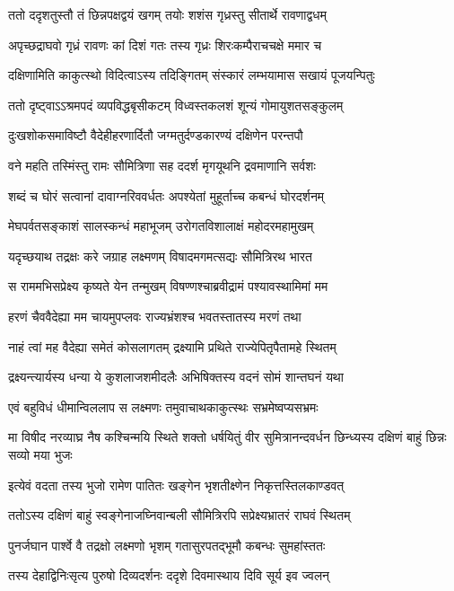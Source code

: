 \twolineshloka
{ततो ददृशतुस्तौ तं छिन्नपक्षद्वयं खगम्}
{तयोः शशंस गृध्रस्तु सीतार्थे रावणाद्वधम्}


\twolineshloka
{अपृच्छद्राघवो गृध्रं रावणः कां दिशं गतः}
{तस्य गृध्रः शिरःकम्पैराचचक्षे ममार च}


\twolineshloka
{दक्षिणामिति काकुत्स्थो विदित्वाऽस्य तदिङ्गितम्}
{संस्कारं लम्भयामास सखायं पूजयन्पितुः}


\twolineshloka
{ततो दृष्ट्वाऽऽश्रमपदं व्यपविद्धबृसीकटम्}
{विध्वस्तकलशं शून्यं गोमायुशतसङ्कुलम्}


\twolineshloka
{दुःखशोकसमाविष्टौ वैदेहीहरणार्दितौ}
{जग्मतुर्दण्डकारण्यं दक्षिणेन परन्तपौ}


\twolineshloka
{वने महति तस्मिंस्तु रामः सौमित्रिणा सह}
{ददर्श मृगयूथनि द्रवमाणानि सर्वशः}


\twolineshloka
{शब्दं च घोरं सत्वानां दावाग्नरिववर्धतः}
{अपश्येतां मुहूर्ताच्च कबन्धं घोरदर्शनम्}


\twolineshloka
{मेघपर्वतसङ्काशं सालस्कन्धं महाभूजम्}
{उरोगतविशालाक्षं महोदरमहामुखम्}


\twolineshloka
{यदृच्छयाथ तद्रक्षः करे जग्राह लक्ष्मणम्}
{विषादमगमत्सद्यः सौमित्रिरथ भारत}


\twolineshloka
{स राममभिसप्रेक्ष्य कृष्यते येन तन्मुखम्}
{विषण्णश्चाब्रवीद्रामं पश्यावस्थामिमां मम}


\twolineshloka
{हरणं चैववैदेह्या मम चायमुपप्लवः}
{राज्यभ्रंशश्च भवतस्तातस्य मरणं तथा}


\twolineshloka
{नाहं त्वां मह वैदेह्या समेतं कोसलागतम्}
{द्रक्ष्यामि प्रथिते राज्येपितृपैतामहे स्थितम्}


\twolineshloka
{द्रक्ष्यन्त्यार्यस्य धन्या ये कुशलाजशमीदलैः}
{अभिषिक्तस्य वदनं सोमं शान्तघनं यथा}


\twolineshloka
{एवं बहुविधं धीमान्विललाप स लक्ष्मणः}
{तमुवाचाथकाकुत्स्थः सभ्रमेष्वप्यसभ्रमः}


\threelineshloka
{मा विषीद नरव्याघ्र नैष कश्चिन्मयि स्थिते}
{शक्तो धर्षयितुं वीर सुमित्रानन्दवर्धन}
{छिन्ध्यस्य दक्षिणं बाहुं छिन्नः सव्यो मया भुजः}


\twolineshloka
{इत्येवं वदता तस्य भुजो रामेण पातितः}
{खङ्गेन भृशतीक्ष्णेन निकृत्तस्तिलकाण्डवत्}


\twolineshloka
{ततोऽस्य दक्षिणं बाहुं स्वङ्गेनाजघ्निवान्बली}
{सौमित्रिरपि सप्रेक्ष्यभ्रातरं राघवं स्थितम्}


\twolineshloka
{पुनर्जघान पार्श्वे वै तद्रक्षो लक्ष्मणो भृशम्}
{गतासुरपतद्भूमौ कबन्धः सुमहांस्ततः}


\twolineshloka
{तस्य देहाद्विनिःसृत्य पुरुषो दिव्यदर्शनः}
{ददृशे दिवमास्थाय दिवि सूर्य इव ज्वलन्}


